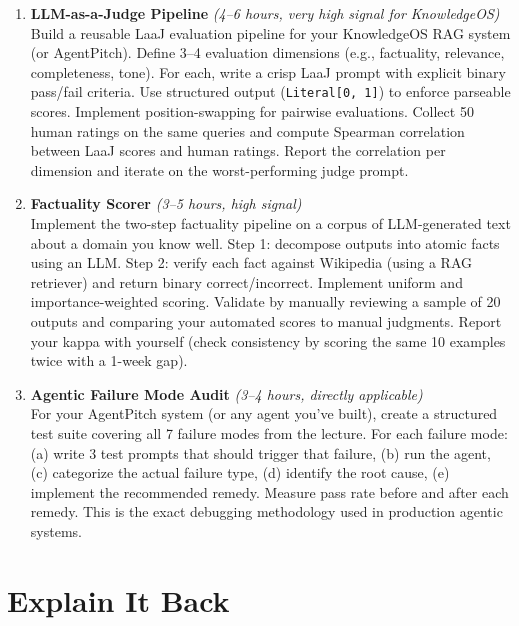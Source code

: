 \documentclass[11pt, a4paper]{article}
\begin{document}
\begin{enumerate}[leftmargin=2em]
  \item \textbf{LLM-as-a-Judge Pipeline} \textit{(4--6 hours, very high signal for KnowledgeOS)}\\
  Build a reusable LaaJ evaluation pipeline for your KnowledgeOS RAG system (or AgentPitch). Define 3--4 evaluation dimensions (e.g., factuality, relevance, completeness, tone). For each, write a crisp LaaJ prompt with explicit binary pass/fail criteria. Use structured output (\texttt{Literal[0, 1]}) to enforce parseable scores. Implement position-swapping for pairwise evaluations. Collect 50 human ratings on the same queries and compute Spearman correlation between LaaJ scores and human ratings. Report the correlation per dimension and iterate on the worst-performing judge prompt.

  \item \textbf{Factuality Scorer} \textit{(3--5 hours, high signal)}\\
  Implement the two-step factuality pipeline on a corpus of LLM-generated text about a domain you know well. Step 1: decompose outputs into atomic facts using an LLM. Step 2: verify each fact against Wikipedia (using a RAG retriever) and return binary correct/incorrect. Implement uniform and importance-weighted scoring. Validate by manually reviewing a sample of 20 outputs and comparing your automated scores to manual judgments. Report your kappa with yourself (check consistency by scoring the same 10 examples twice with a 1-week gap).

  \item \textbf{Agentic Failure Mode Audit} \textit{(3--4 hours, directly applicable)}\\
  For your AgentPitch system (or any agent you've built), create a structured test suite covering all 7 failure modes from the lecture. For each failure mode: (a) write 3 test prompts that should trigger that failure, (b) run the agent, (c) categorize the actual failure type, (d) identify the root cause, (e) implement the recommended remedy. Measure pass rate before and after each remedy. This is the exact debugging methodology used in production agentic systems.
\end{enumerate}

\newpage
\section{Explain It Back}
\end{document}
